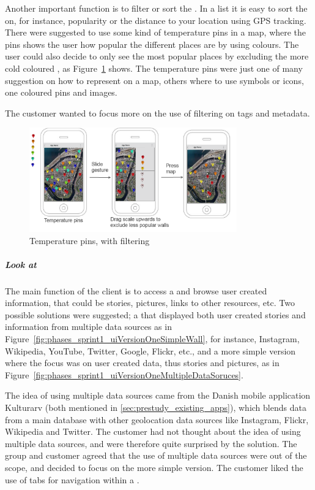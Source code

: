 \documentclass[11pt]{book}
\begin{document}
Another important function is to filter or sort the \wallentityp. In a list it is easy to sort the \wallentityp on, for instance, popularity or the distance to your location using GPS tracking. There were suggested to use some kind of temperature pins in a map, where the pins shows the user how popular the different places are by using colours. The user could also decide to only see the most popular places by excluding the more cold coloured \wallentityp, as Figure~\ref{fig:phases_sprint1_uiVersionOneTempPings} shows. The temperature pins were just one of many suggestion on how to represent \wallentityp on a map, others where to use symbols or icons, one coloured pins and images.

The customer wanted to focus more on the use of filtering on tags and metadata.

\begin{figure}[H]
    \centering
    \includegraphics[width=0.8\textwidth]{Figures/Phases/Sprint1/versiononeTempPings.png}
    \caption{Temperature pins, with filtering}
    \label{fig:phases_sprint1_uiVersionOneTempPings}
\end{figure}

\subparagraph{Look at \wallentityp}
The main function of the client is to access a \wallentitys and browse user created information, that could be stories, pictures, links to other resources, etc. Two possible solutions were suggested; a \wallentitys that displayed both user created stories and information from multiple data sources as in Figure~\ref{fig:phases_sprint1_uiVersionOneSimpleWall}, for instance, Instagram, Wikipedia, YouTube, Twitter, Google, Flickr, etc., and a more simple version where the focus was on user created data, thus stories and pictures, as in Figure~\ref{fig:phases_sprint1_uiVersionOneMultipleDataSoruces}. 

The idea of using multiple data sources came from the Danish mobile application Kulturarv (both mentioned in \ref{sec:prestudy_existing_apps}), which blends data from a main database with other geolocation data sources like Instagram, Flickr, Wikipedia and Twitter. The customer had not thought about the idea of using multiple data sources, and were therefore quite surprised by the solution. The group and customer agreed that the use of multiple data sources were out of the scope, and decided to focus on the more simple version. The customer liked the use of tabs for navigation within a \wallentitys.
\end{document}
